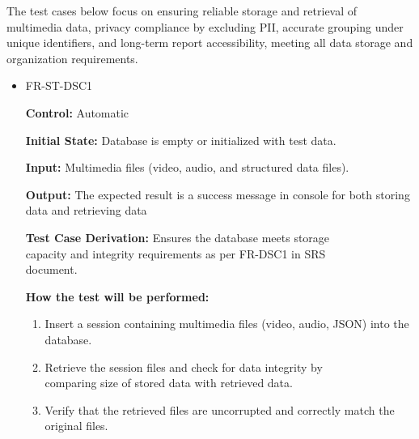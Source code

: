 \documentclass[12pt, titlepage]{article}
\begin{document}
\hspace{2em}The test cases below focus on ensuring reliable storage and retrieval 
of multimedia data, privacy compliance by excluding PII, accurate grouping under 
unique identifiers, and long-term report accessibility, meeting all data storage 
and organization requirements.
\begin{itemize}
  \item FR-ST-DSC1
  \begin{mdframed}[linewidth=0.5mm]
      \textbf{Control:} Automatic \par
      \textbf{Initial State:} Database is empty or initialized with test data. \par
      \textbf{Input:} Multimedia files (video, audio, and structured data files). \par
      \textbf{Output:} The expected result is a success message in console for both storing data and retrieving data \par
      \textbf{Test Case Derivation:} Ensures the database meets storage \\capacity and integrity requirements as per FR-DSC1 in SRS \\document. \par
      \textbf{How the test will be performed:}
      \begin{enumerate}[noitemsep]
        \item Insert a session containing multimedia files (video, audio, JSON) into the database.
        \item Retrieve the session files and check for data integrity by \\comparing size of stored data with retrieved data.
        \item Verify that the retrieved files are uncorrupted and correctly match the original files.
      \end{enumerate}
  \end{mdframed}


\end{itemize}
\end{document}
